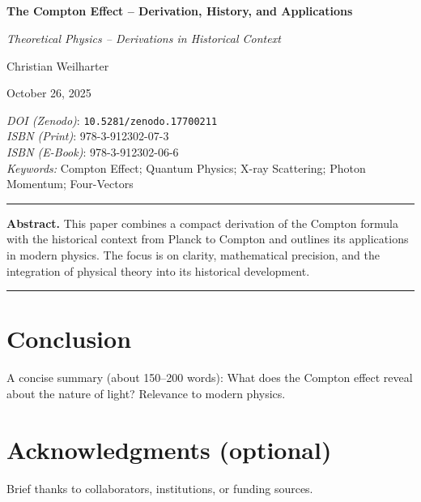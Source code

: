 \documentclass[12pt,oneside]{scrartcl}
\title{\PaperTitle\\[0.5em]\large \SeriesTitle}
\author{\PaperAuthor}
\date{\PaperDate}
\newcommand{\SeriesTitle}{Theoretical Physics – Derivations in Historical Context}
\newcommand{\PaperTitle}{The Compton Effect – Derivation, History, and Applications}
\newcommand{\PaperAuthor}{Christian Weilharter}
\newcommand{\PaperDate}{October 26, 2025}
\newcommand{\PaperDOI}{\emph{DOI (Zenodo)}: \texttt{10.5281/zenodo.17700211}}
\newcommand{\PaperISBNPDF}{\emph{ISBN (Print)}: 978-3-912302-07-3}
\newcommand{\PaperISBNEPUB}{\emph{ISBN (E-Book)}: 978-3-912302-06-6}
\newcommand{\PaperKeywords}{Compton Effect; Quantum Physics; X-ray Scattering; Photon Momentum; Four-Vectors}
\newcommand{\PaperMetadata}{
	\vspace{1em}
	\begin{flushleft}
		\small
		\setlength{\parskip}{3pt}
		\noindent\PaperDOI\\
		\PaperISBNPDF\\
		\PaperISBNEPUB\\
		\textit{Keywords:} \PaperKeywords
	\end{flushleft}
	\vspace{1em}
}
\begin{document}
	\thispagestyle{empty}
	\begin{center}
		{\Huge\bfseries \PaperTitle\par}
		\vspace{0.5em}
		{\Large\itshape \SeriesTitle\par}
		\vspace{2em}
		{\Large \PaperAuthor\par}
		\vspace{0.5em}
		{\large \PaperDate\par}
	\end{center}
	
	\PaperMetadata
	
	\vspace{1em}
	\hrule
	\vspace{1em}
	
	\noindent\textbf{Abstract.}  
	This paper combines a compact derivation of the Compton formula with the historical context from Planck to Compton and outlines its applications in modern physics. The focus is on clarity, mathematical precision, and the integration of physical theory into its historical development.
	
	\vspace{1em}
	\hrule
	\vspace{2em}
	
	
	
	
	
	
	
	
	
	
	
	
	
	
	
	
	
	

	

	
	\section{Conclusion}
	A concise summary (about 150–200 words): What does the Compton effect reveal about the nature of light? Relevance to modern physics.
	
	\section*{Acknowledgments (optional)}
	Brief thanks to collaborators, institutions, or funding sources.
	
\end{document}
